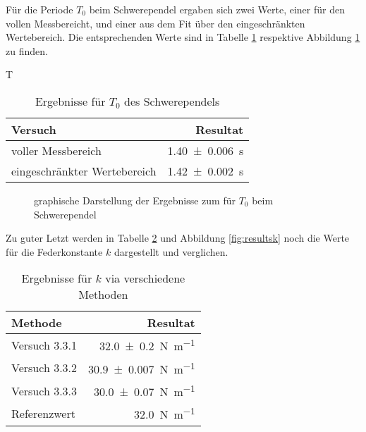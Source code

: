 F\"ur  die  Periode   $T_0$  beim  Schwerependel  ergaben   sich  zwei  Werte,
einer  f\"ur  den vollen  Messbereicht,  und  einer  aus  dem Fit  \"uber  den
eingeschr\"ankten  Wertebereich. Die  entsprechenden  Werte  sind  in  Tabelle
\ref{tab:resultsT0} respektive Abbildung \ref{fig:resultsT0} zu finden.

T\begin{table}[h!]
    \centering
    \caption{Ergebnisse f\"ur $T_0$ des Schwerependels}
    \label{tab:resultsT0}
    \begin{tabular}{p{70mm}r}
        \toprule
        Versuch                         & Resultat \\
        \midrule
        voller Messbereich              & \SI{1.40 \pm 0.006}{\second} \\
        eingeschr\"ankter Wertebereich  & \SI{1.42 \pm 0.002}{\second} \\
        \bottomrule
    \end{tabular}
\end{table}

\pgfplotsset{try min ticks=2}
\begin{figure}[ht!]
\centering
{}
\caption{graphische Darstellung der Ergebnisse zum f\"ur $T_0$ beim Schwerependel}
\label{fig:resultsT0}
\end{figure}

Zu   guter  Letzt   werden   in  Tabelle   \ref{tab:resultsk}  und   Abbildung
\ref{fig:resultsk} noch die Werte f\"ur die Federkonstante $k$ dargestellt und
verglichen.

\begin{table}[h!]
    \centering
    \caption{Ergebnisse f\"ur $k$ via verschiedene Methoden}
    \label{tab:resultsk}
    \begin{tabular}{p{70mm}r}
        \toprule
        Methode       & Resultat \\
        \midrule
        Versuch 3.3.1 & \SI{32.0 \pm  0.2}{\newton\per\meter} \\
        Versuch 3.3.2 & \SI{30.9 \pm  0.007}{\newton\per\meter} \\
        Versuch 3.3.3 & \SI{30.0 \pm  0.07}{\newton\per\meter} \\
        Referenzwert  & \SI{32.0}{\newton\per\meter} \\
        \bottomrule
    \end{tabular}
\end{table}

